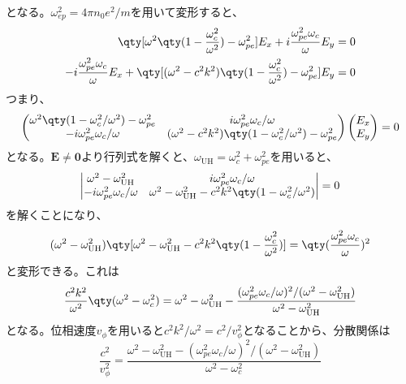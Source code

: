 となる。$\omega^2_{ep} = 4\pi{}n_0e^2/m$を用いて変形すると、
\begin{align}
	\qty[\omega^2\qty(1-\frac{\omega_c^2}{\omega^2}) - \omega^2_{pe}]E_x + i\frac{\omega^2_{pe}\omega_c}{\omega}E_y            & = 0 \\
	-i\frac{\omega^2_{pe}\omega_c}{\omega}E_x +\qty[(\omega^2 - c^2k^2)\qty(1-\frac{\omega^2_c}{\omega^2}) - \omega^2_{pe}]E_y & = 0
\end{align}
つまり、
\begin{equation}
	\begin{pmatrix}
		\omega^2\qty(1-{\omega_c^2}/{\omega^2}) - \omega^2_{pe} & i{\omega^2_{pe}\omega_c}/{\omega}                                  \\
		-i{\omega^2_{pe}\omega_c}/{\omega}                      & (\omega^2 - c^2k^2)\qty(1-{\omega^2_c}/{\omega^2}) - \omega^2_{pe}
	\end{pmatrix}
	\begin{pmatrix}
		E_x \\ E_y
	\end{pmatrix} = 0
\end{equation}
となる。$\bm{E}\neq\bm{0}$より行列式を解くと、$\omega_{\text{UH}} = \omega^2_c + \omega^2_{pe}$を用いると、
\begin{equation}
	\begin{vmatrix}
		\omega^2 - \omega^2_{\text{UH}}    & i{\omega^2_{pe}\omega_c}/{\omega}                                       \\
		-i{\omega^2_{pe}\omega_c}/{\omega} & \omega^2 - \omega^2_{\text{UH}} - c^2k^2\qty(1-{\omega^2_c}/{\omega^2})
	\end{vmatrix} = 0
\end{equation}
を解くことになり、
\begin{equation}
	(\omega^2-\omega^2_{\text{UH}})\qty[\omega^2-\omega^2_{\text{UH}} - c^2k^2\qty(1-\frac{\omega^2_c}{\omega^2})] = \qty(\frac{\omega^2_{pe}\omega_c}{\omega})^2
\end{equation}
と変形できる。これは
\begin{equation}
	\frac{c^2k^2}{\omega^2}\qty(\omega^2-\omega^2_c) = \omega^2-\omega^2_{\text{UH}} - \frac{(\omega^2_{pe}\omega_c/\omega)^2/(\omega^2-\omega^2_{\text{UH}})}{\omega^2-\omega^2_{\text{UH}}}
\end{equation}
となる。位相速度$v_{\phi}$を用いると$c^2k^2/\omega^2 = c^2/v^2_{\phi}$となることから、分散関係は
\begin{equation}
	\frac{c^2}{v^2_{\phi}} = \frac{\omega^2-\omega^2_{\text{UH}} - (\omega^2_{pe}\omega_c/\omega)^2/(\omega^2-\omega^2_{\text{UH}})}{\omega^2-\omega^2_c}
\end{equation}
